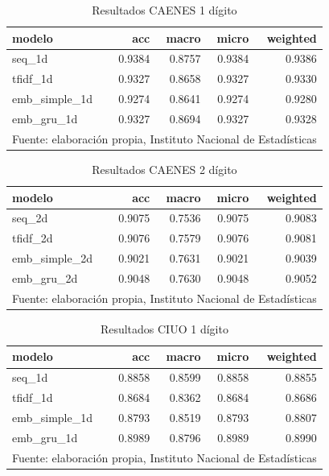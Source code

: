 \documentclass[
  12pt,
  spanish,
]{article}
\begin{document}
\begin{table}[H]

\caption{\label{tab:unnamed-chunk-2}Resultados CAENES 1 dígito}
\centering
\fontsize{9.5}{11.5}\selectfont
\begin{tabular}[t]{lrrrr}
\toprule
modelo & acc & macro & micro & weighted\\
\midrule
seq\_1d & 0.9384 & 0.8757 & 0.9384 & 0.9386\\
tfidf\_1d & 0.9327 & 0.8658 & 0.9327 & 0.9330\\
emb\_simple\_1d & 0.9274 & 0.8641 & 0.9274 & 0.9280\\
emb\_gru\_1d & 0.9327 & 0.8694 & 0.9327 & 0.9328\\
\bottomrule
\multicolumn{5}{l}{\rule{0pt}{1em}Fuente: elaboración propia, Instituto Nacional de Estadísticas }\\
\end{tabular}
\end{table}

\begin{table}[H]

\caption{\label{tab:unnamed-chunk-2}Resultados CAENES 2 dígito}
\centering
\fontsize{9.5}{11.5}\selectfont
\begin{tabular}[t]{lrrrr}
\toprule
modelo & acc & macro & micro & weighted\\
\midrule
seq\_2d & 0.9075 & 0.7536 & 0.9075 & 0.9083\\
tfidf\_2d & 0.9076 & 0.7579 & 0.9076 & 0.9081\\
emb\_simple\_2d & 0.9021 & 0.7631 & 0.9021 & 0.9039\\
emb\_gru\_2d & 0.9048 & 0.7630 & 0.9048 & 0.9052\\
\bottomrule
\multicolumn{5}{l}{\rule{0pt}{1em}Fuente: elaboración propia, Instituto Nacional de Estadísticas }\\
\end{tabular}
\end{table}

\begin{table}[H]

\caption{\label{tab:unnamed-chunk-2}Resultados CIUO 1 dígito}
\centering
\fontsize{9.5}{11.5}\selectfont
\begin{tabular}[t]{lrrrr}
\toprule
modelo & acc & macro & micro & weighted\\
\midrule
seq\_1d & 0.8858 & 0.8599 & 0.8858 & 0.8855\\
tfidf\_1d & 0.8684 & 0.8362 & 0.8684 & 0.8686\\
emb\_simple\_1d & 0.8793 & 0.8519 & 0.8793 & 0.8807\\
emb\_gru\_1d & 0.8989 & 0.8796 & 0.8989 & 0.8990\\
\bottomrule
\multicolumn{5}{l}{\rule{0pt}{1em}Fuente: elaboración propia, Instituto Nacional de Estadísticas }\\
\end{tabular}
\end{table}
\end{document}
